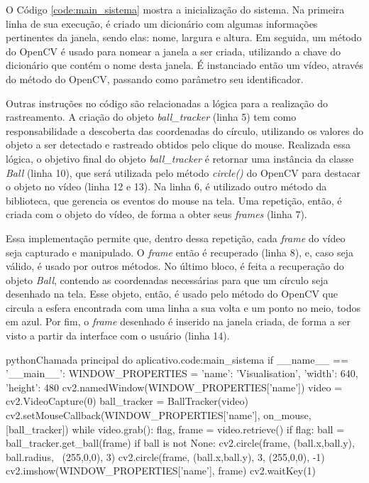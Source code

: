 O Código \ref{code:main_sistema} mostra a inicialização do sistema. Na primeira linha de sua execução, é criado um dicionário com algumas informações pertinentes da janela, sendo elas: nome, largura e altura. Em seguida, um método do OpenCV é usado para nomear a janela a ser criada, utilizando a chave do dicionário que contém o nome desta janela. É instanciado então um vídeo, através do método do OpenCV, passando como parâmetro seu identificador.

Outras instruções no código são relacionadas a lógica para a realização do rastreamento. A criação do objeto \textit{ball\_tracker} (linha 5) tem como responsabilidade a descoberta das coordenadas do círculo, utilizando os valores do objeto a ser detectado e rastreado obtidos pelo clique do mouse. Realizada essa lógica, o objetivo final do objeto \textit{ball\_tracker} é retornar uma instância da classe \textit{Ball} (linha 10), que será utilizada pelo método \textit{circle()} do OpenCV para destacar o objeto no vídeo (linha 12 e 13). Na linha 6, é utilizado outro método da biblioteca, que gerencia os eventos do mouse na tela. Uma repetição, então, é criada com o objeto do vídeo, de forma a obter seus \textit{frames} (linha 7).

Essa implementação permite que, dentro dessa repetição, cada \textit{frame} do vídeo seja capturado e manipulado. O \textit{frame} então é recuperado (linha 8), e, caso seja válido, é usado por outros métodos. No último bloco, é feita a recuperação do objeto \textit{Ball}, contendo as coordenadas necessárias para que um círculo seja desenhado na tela. Esse objeto, então, é usado pelo método do OpenCV que circula a esfera encontrada com uma linha a sua volta e um ponto no meio, todos em azul. Por fim, o \textit{frame} desenhado é inserido na janela criada, de forma a ser visto a partir da interface com o usuário (linha 14).

\begin{code}{python}{Chamada principal do aplicativo.}{code:main_sistema}
if __name__ == '__main__':
	WINDOW_PROPERTIES = {'name': 'Visualisation', 'width': 640, 'height': 480}
	cv2.namedWindow(WINDOW_PROPERTIES['name'])
	video = cv2.VideoCapture(0)
	ball_tracker = BallTracker(video)
	cv2.setMouseCallback(WINDOW_PROPERTIES['name'], on_mouse, [ball_tracker])
	while video.grab():
		flag, frame = video.retrieve()
		if flag:
			ball = ball_tracker.get_ball(frame)
			if ball is not None:
				cv2.circle(frame, (ball.x,ball.y), ball.radius, \
					(255,0,0), 3)
				cv2.circle(frame, (ball.x,ball.y), 3, (255,0,0), -1)
			cv2.imshow(WINDOW_PROPERTIES['name'], frame)
			cv2.waitKey(1)
\end{code}

